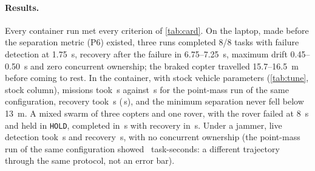 \documentclass[a4paper,11pt]{article}
\newcommand{\code}[1]{\texttt{\codebreaks#1\endcodebreaks}}
\def\codebreaks{\begingroup\def\_{\textunderscore\allowbreak}\def\/{/\allowbreak}}
\def\endcodebreaks{\endgroup}
\begin{document}
\paragraph{Results.} Every container run met every criterion of \cref{tab:card}.
On the laptop, made before the separation metric (P6) existed, three runs completed 8/8 tasks with failure detection at
\SI{1.75}{s}, recovery after the failure in 6.75--\SI{7.25}{s}, maximum drift
0.45--\SI{0.50}{s} and zero concurrent ownership; the braked copter travelled
15.7--\SI{16.5}{m} before coming to rest. In the container, with stock vehicle
parameters (\cref{tab:tune}, stock column), missions took \stockMission\,\si{s} against
\pmMission\,\si{s} for the point-mass run of the same configuration, recovery
took \stockRecovery\,\si{s} (\pmRecovery\,\si{s}), and the minimum separation
never fell below \SI{13}{m}. A mixed swarm of three copters and one rover, with
the rover failed at \SI{8}{s} and held in \code{HOLD}, completed in
\mixMission\,\si{s} with recovery in \mixRecovery\,\si{s}. Under a jammer, live
detection took \jamDetection\,\si{s} and recovery \jamRecovery\,\si{s}, with no
concurrent ownership (the point-mass run of the same configuration showed
\jamPmOwnership\,\si{} task-seconds: a different trajectory through the same
protocol, not an error bar).
\end{document}
